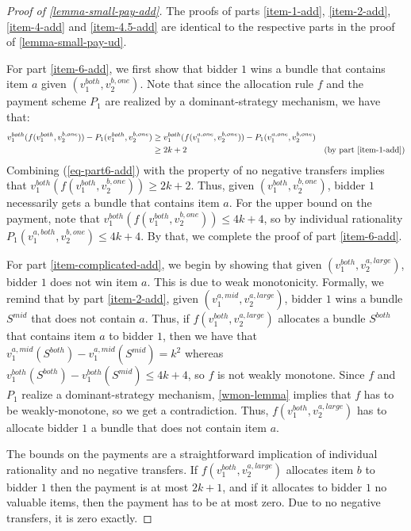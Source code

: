 \begin{proof}[Proof of \cref{lemma-small-pay-add}]
The proofs of parts \ref{item-1-add}, \ref{item-2-add}, \ref{item-4-add} and \ref{item-4.5-add} are identical to the respective parts in the proof of \cref{lemma-small-pay-ud}. 


For part \ref{item-6-add}, we first show that bidder $1$ wins a bundle that contains item $a$ given $(v_1^{both},v_2^{b,one})$. Note that since the allocation rule $f$ and the payment scheme $P_1$ are realized by a dominant-strategy mechanism, we have that:
\begin{equation}\label{eq-part6-add}
\begin{aligned}
    v_1^{both}(f(v_1^{both},v_2^{b,one}))-P_1(v_1^{both},v_2^{b,one})&\ge v_1^{both}(f(v_1^{a,one},v_2^{b,one}))-P_1(v_1^{a,one},v_2^{b,one}) \\
    &\ge 2k+2 &\text{(by part \ref{item-1-add})}
\end{aligned}    
\end{equation}
Combining (\ref{eq-part6-add}) with the property of no negative transfers implies that $v_1^{both}(f(v_1^{both},v_2^{b,one}))\ge 2k+2$. Thus, given $(v_1^{both},v_2^{b,one})$, bidder $1$ necessarily gets a bundle that contains item $a$. 
For the upper bound on the payment, note that $v_1^{both}(f(v_1^{both},v_2^{b,one}))\le 4k+4$, so by individual rationality  $P_1(v_1^{a,both},v_2^{b,one})\le 4k+4$. By that, we  complete the proof of part \ref{item-6-add}. 

For part \ref{item-complicated-add},
we begin by showing that given $(v_1^{both},v_2^{a,large})$, bidder $1$ does not win item $a$. This is due to weak monotonicity. Formally, we remind that by part \ref{item-2-add}, given $(v_1^{a,mid},v_2^{a,large})$, bidder $1$ wins a bundle $S^{mid}$
that does not contain $a$. Thus, if $f(v_1^{both},v_2^{a,large})$ allocates 
a bundle $S^{both}$ that contains item $a$ to bidder $1$, then we have that $v_1^{a,mid}(S^{both})-v_1^{a,mid}(S^{mid})=k^2$ whereas $v_1^{both}(S^{both})-v_1^{both}(S^{mid})\le 4k+4$, so $f$ is not weakly monotone. Since $f$ and $P_1$ realize a dominant-strategy mechanism, \cref{wmon-lemma} implies that $f$ has to be weakly-monotone, so we get a contradiction. Thus, $f(v_1^{both},v_2^{a,large})$ has to allocate bidder $1$ a bundle that does not contain item $a$. 

The bounds on the payments are a straightforward implication of individual rationality and no negative transfers. If $f(v_1^{both},v_2^{a,large})$ allocates item $b$ to bidder $1$ then the payment is at most $2k+1$, and if it allocates to bidder $1$ no valuable items, then the payment has to be at most zero. Due to no negative transfers, it is zero exactly.   
\end{proof}

